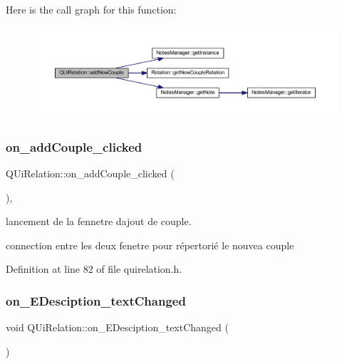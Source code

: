 Here is the call graph for this function\+:\nopagebreak
\begin{figure}[H]
\begin{center}
\leavevmode
\includegraphics[width=350pt]{class_q_ui_relation_a05ca085cba21dd2c3004f1f77dd32872_cgraph}
\end{center}
\end{figure}
\mbox{\label{class_q_ui_relation_ac818830c30b1bcd898e76308b07dc154}} 
\subsubsection{\texorpdfstring{on\+\_\+add\+Couple\+\_\+clicked}{on\_addCouple\_clicked}}
{\footnotesize\ttfamily Q\+Ui\+Relation\+::on\+\_\+add\+Couple\+\_\+clicked (\begin{DoxyParamCaption}{ }\end{DoxyParamCaption})\hspace{0.3cm}{\ttfamily [inline]}, {\ttfamily [slot]}}



lancement de la fennetre d\textquotesingle{}ajout de couple. 

connection entre les deux fenetre pour répertorié le nouvea couple 

Definition at line 82 of file quirelation.\+h.

\mbox{\label{class_q_ui_relation_a092e6a03e3ca7b4f6bb061d6b618edb0}} 
\subsubsection{\texorpdfstring{on\+\_\+\+E\+Desciption\+\_\+text\+Changed}{on\_EDesciption\_textChanged}}
{\footnotesize\ttfamily void Q\+Ui\+Relation\+::on\+\_\+\+E\+Desciption\+\_\+text\+Changed (\begin{DoxyParamCaption}{ }\end{DoxyParamCaption})\hspace{0.3cm}{\ttfamily [slot]}}

